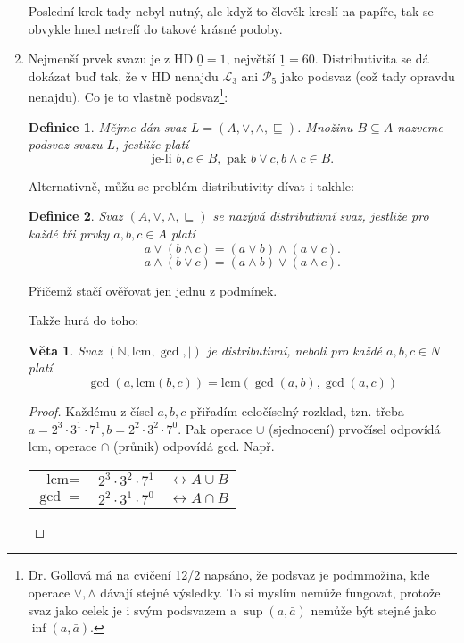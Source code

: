 \documentclass{article}
\newtheorem{definice}{Definice}[section]
\newtheorem{veta}{Věta}[section]
\begin{document}
\begin{enumerate}
\renewcommand{\labelenumi}{\alph{enumi})}

Poslední krok tady nebyl nutný, ale když to člověk kreslí na papíře, tak se obvykle hned netrefí do takové krásné podoby. 

\item Nejmenší prvek svazu je z HD $\underline{0} = 1$, největší $\underline{1} = 60$. Distributivita se dá dokázat buď tak, že v HD nenajdu $\mathcal{L}_3$ ani $\mathcal{P}_5$ jako podsvaz (což tady opravdu nenajdu). Co je to vlastně podsvaz\footnote{Dr. Gollová má na cvičení 12/2 napsáno, že podsvaz je podmmožina, kde operace $\vee, \wedge$ dávají stejné výsledky. To si myslím nemůže fungovat, protože svaz jako celek je i svým podsvazem a $\sup(a,\bar{a})$ nemůže být stejné jako $\inf(a,\bar{a})$.}:

\begin{definice}
\label{podsvaz}
Mějme dán svaz $L = (A,\vee,\wedge,\sqsubseteq)$. Množinu $B \subseteq A$ nazveme \emph{podsvaz} svazu $L$, jestliže platí
\[ \text{je-li } b,c \in B, \text{ pak } b \vee c, b \wedge c \in B.  \]
\end{definice}

Alternativně, můžu se problém distributivity dívat i takhle:
\begin{definice}
Svaz $(A,\vee,\wedge,\sqsubseteq)$ se nazývá \emph{distributivní} svaz, jestliže pro každé tři prvky $a,b,c \in A$ platí
\[ a \vee (b \wedge c) = (a \vee b) \wedge (a \vee c).  \]
\[ a \wedge (b \vee c) = (a \wedge b) \vee (a \wedge c).  \]
\end{definice}

Přičemž stačí ověřovat jen jednu z podmínek.

Takže hurá do toho:

\begin{veta}
Svaz $(\mathbb{N}, \text{lcm}, \gcd,|)$ je distributivní, neboli pro každé $a,b,c \in N$ platí 
\[ \gcd(a, \mbox{lcm}(b,c)) = \mbox{lcm}(\gcd(a,b), \gcd(a,c)) \]
\end{veta}
\begin{proof}
Každému z čísel $a,b,c$ přiřadím celočíselný rozklad, tzn. třeba  $a = 2^3\cdot3^1 \cdot 7^1,  b = 2^2\cdot 3^2 \cdot7^0$. Pak operace $\cup$ (sjednocení) prvočísel odpovídá lcm, operace $\cap$ (průnik) odpovídá gcd. Např.

\begin{center}  %
  \begin{tabular}{rll}
		$\mbox{lcm}=$& $2^3\cdot3^2\cdot7^1$ & $\leftrightarrow A \cup B$\\ 
		$\gcd=$ & $2^2\cdot3^1\cdot7^0$ & $\leftrightarrow A \cap B $
	\end{tabular}
\end{center} 


\end{proof}
\end{enumerate}
\end{document}
